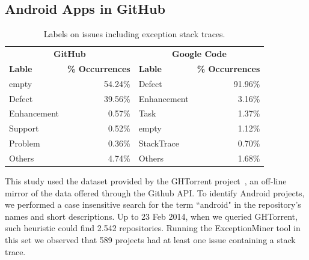\documentclass[conference]{IEEEtran}
\begin{document}


\subsection{Android Apps in GitHub}
\label{sec:git}


\begin{table}
  \centering
  \begin{tabular}{lr|lr}
    \hline
     \multicolumn{2}{c}{\bfseries{GitHub}} &  \multicolumn{2}{c}{\bfseries{Google Code}} \\
      \bfseries{Lable} &  \bfseries{\% Occurrences} &  \bfseries{Lable} &  \bfseries{\% Occurrences} \\
    \hline
empty &	54.24\% & Defect &	91.96\% \\
Defect &	39.56\%  & Enhancement  &	3.16\% \\
Enhancement &	0.57\% & Task	& 1.37\% \\
Support &	0.52\% & empty &	1.12\% \\
Problem &	0.36\% & StackTrace &	0.70\% \\
Others &	4.74\% &  Others &	1.68\% \\   
  \hline
  \end{tabular}
  \caption{Labels on issues including exception stack traces.}
  \label{tab:lables}
\end{table}


This study used the dataset provided by the GHTorrent project~\cite{Gousi13}, 
an off-line mirror of the data  offered through the Github API.  
To identify Android projects, we performed a case insensitive search for the
term ``android" in the repository's names and short descriptions.  
Up to 23 Feb 2014,  when we queried GHTorrent, such heuristic could
 find 2.542 repositories. Running the ExceptionMiner tool 
 in this set we observed that 589 projects had at least one issue containing a stack trace.
	
\end{document}
